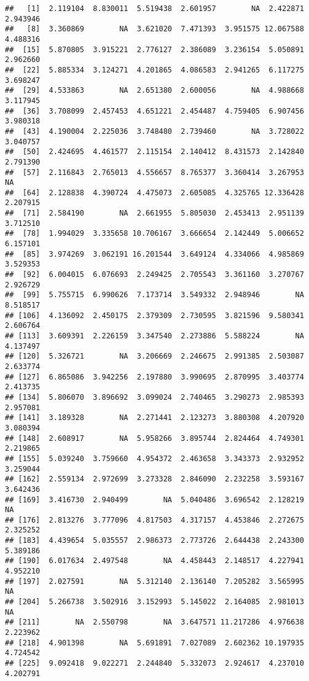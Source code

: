 \documentclass[
]{article}
\begin{document}
\begin{verbatim}
##   [1]  2.119104  8.830011  5.519438  2.601957        NA  2.422871  2.943946
##   [8]  3.360869        NA  3.621020  7.471393  3.951575 12.067588  4.488316
##  [15]  5.870805  3.915221  2.776127  2.386089  3.236154  5.050891  2.962660
##  [22]  5.885334  3.124271  4.201865  4.086583  2.941265  6.117275  3.698247
##  [29]  4.533863        NA  2.651380  2.600056        NA  4.988668  3.117945
##  [36]  3.708099  2.457453  4.651221  2.454487  4.759405  6.907456  3.980318
##  [43]  4.190004  2.225036  3.748480  2.739460        NA  3.728022  3.040757
##  [50]  2.424695  4.461577  2.115154  2.140412  8.431573  2.142840  2.791390
##  [57]  2.116843  2.765013  4.556657  8.765377  3.360414  3.267953        NA
##  [64]  2.128838  4.390724  4.475073  2.605085  4.325765 12.336428  2.207915
##  [71]  2.584190        NA  2.661955  5.805030  2.453413  2.951139  3.712510
##  [78]  1.994029  3.335658 10.706167  3.666654  2.142449  5.006652  6.157101
##  [85]  3.974269  3.062191 16.201544  3.649124  4.334066  4.985869  3.529353
##  [92]  6.004015  6.076693  2.249425  2.705543  3.361160  3.270767  2.926729
##  [99]  5.755715  6.990626  7.173714  3.549332  2.948946        NA  8.518517
## [106]  4.136092  2.450175  2.379309  2.730595  3.821596  9.580341  2.606764
## [113]  3.609391  2.226159  3.347540  2.273886  5.588224        NA  4.137497
## [120]  5.326721        NA  3.206669  2.246675  2.991385  2.503087  2.633774
## [127]  6.865086  3.942256  2.197880  3.990695  2.870995  3.403774  2.413735
## [134]  5.806070  3.896692  3.099024  2.740465  3.290273  2.985393  2.957081
## [141]  3.189328        NA  2.271441  2.123273  3.880308  4.207920  3.080394
## [148]  2.608917        NA  5.958266  3.895744  2.824464  4.749301  2.219865
## [155]  5.039240  3.759660  4.954372  2.463658  3.343373  2.932952  3.259044
## [162]  2.559134  2.972699  3.273328  2.846090  2.232258  3.593167  3.642436
## [169]  3.416730  2.940499        NA  5.040486  3.696542  2.128219        NA
## [176]  2.813276  3.777096  4.817503  4.317157  4.453846  2.272675  2.325252
## [183]  4.439654  5.035557  2.986373  2.773726  2.644438  2.243300  5.389186
## [190]  6.017634  2.497548        NA  4.458443  2.148517  4.227941  4.952210
## [197]  2.027591        NA  5.312140  2.136140  7.205282  3.565995        NA
## [204]  5.266738  3.502916  3.152993  5.145022  2.164085  2.981013        NA
## [211]        NA  2.550798        NA  3.647571 11.217286  4.976638  2.223962
## [218]  4.901398        NA  5.691891  7.027089  2.602362 10.197935  4.724542
## [225]  9.092418  9.022271  2.244840  5.332073  2.924617  4.237010  4.202791

\end{verbatim}
\end{document}
